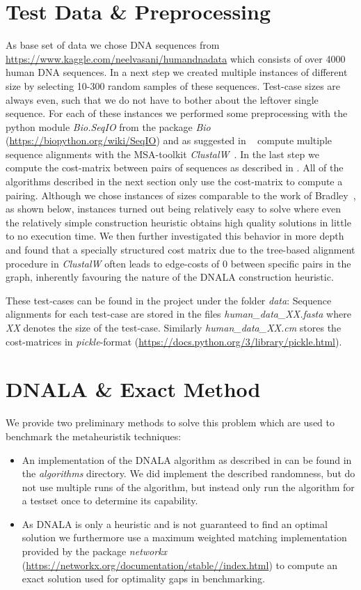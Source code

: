 \documentclass[12pt]{article}
\begin{document}
\section{Test Data \& Preprocessing}
\label{sec:test-data}
As base set of data we chose DNA sequences from \url{https://www.kaggle.com/neelvasani/humandnadata} which consists of over 4000 human DNA sequences.
In a next step we created multiple instances of different size by selecting 10-300 random samples of these sequences.
Test-case sizes are always even, such that we do not have to bother about the leftover single sequence.
For each of these instances we performed some preprocessing with the python module \textit{Bio.SeqIO} from the package \textit{Bio} (\url{https://biopython.org/wiki/SeqIO}) and as suggested in ~\cite{mainpaper} compute multiple sequence alignments with the MSA-toolkit \emph{ClustalW}~\cite{clustalw}. 
In the last step we compute the cost-matrix between pairs of sequences as described in \cite{mainpaper}.
All of the algorithms described in the next section only use the cost-matrix to compute a pairing.
Although we chose instances of sizes comparable to the work of Bradley~\cite{mainpaper}, as shown below, instances turned out being relatively easy to solve where even the relatively simple construction heuristic obtains high quality solutions in little to no execution time. We then further investigated this behavior in more depth and found that a specially structured cost matrix due to the tree-based alignment procedure in \emph{ClustalW} often leads to edge-costs of $0$ between specific pairs in the graph, inherently favouring the nature of the DNALA construction heuristic. 

These test-cases can be found in the project under the folder \textit{data}:
Sequence alignments for each test-case are stored in the files \textit{human\_data\_XX.fasta} where \textit{XX} denotes the size of the test-case.
Similarly \textit{human\_data\_XX.cm} stores the cost-matrices in \textit{pickle}-format (\url{https://docs.python.org/3/library/pickle.html}).

\section{DNALA \& Exact Method}
We provide two preliminary methods to solve this problem which are used to benchmark the metaheuristik techniques:
\begin{itemize}
    \item An implementation of the DNALA algorithm as described in \cite{mainpaper} can be found in the \textit{algorithms} directory.
    We did implement the described randomness, but do not use multiple runs of the algorithm, but instead only run the algorithm for a testset once to determine its capability.

    \item As DNALA is only a heuristic and is not guaranteed to find an optimal solution we furthermore use a maximum weighted matching implementation provided by the package \textit{networkx} (\url{https://networkx.org/documentation/stable//index.html}) to compute an exact solution used for optimality gaps in benchmarking.
\end{itemize}
\end{document}
